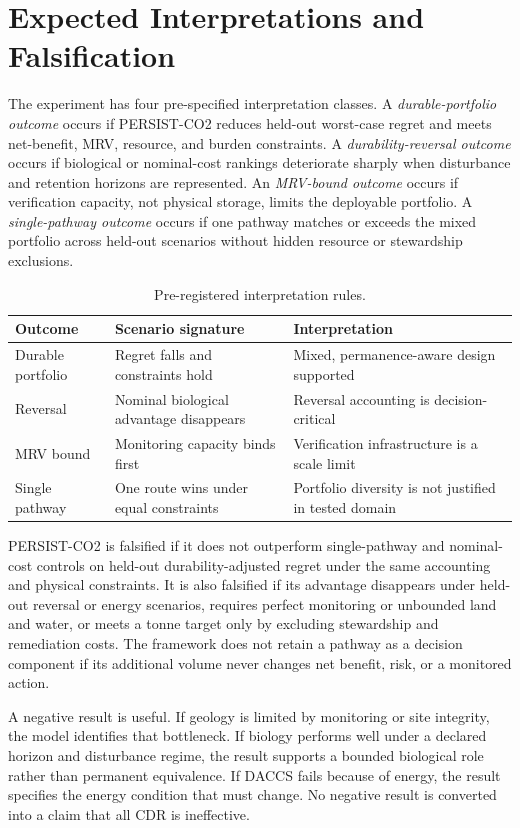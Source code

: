 \documentclass[conference]{IEEEtran}
\begin{document}
\section{Expected Interpretations and Falsification}
The experiment has four pre-specified interpretation classes. A \textit{durable-portfolio outcome} occurs if PERSIST-CO2 reduces held-out worst-case regret and meets net-benefit, MRV, resource, and burden constraints. A \textit{durability-reversal outcome} occurs if biological or nominal-cost rankings deteriorate sharply when disturbance and retention horizons are represented. An \textit{MRV-bound outcome} occurs if verification capacity, not physical storage, limits the deployable portfolio. A \textit{single-pathway outcome} occurs if one pathway matches or exceeds the mixed portfolio across held-out scenarios without hidden resource or stewardship exclusions.

\begin{table}[t]
\centering
\caption{Pre-registered interpretation rules.}
\label{tab:decisions}
\footnotesize
\begin{tabular}{P{1.6cm}P{2.25cm}P{2.25cm}}
\toprule
Outcome & Scenario signature & Interpretation \\
\midrule
Durable portfolio & Regret falls and constraints hold & Mixed, permanence-aware design supported \\
Reversal & Nominal biological advantage disappears & Reversal accounting is decision-critical \\
MRV bound & Monitoring capacity binds first & Verification infrastructure is a scale limit \\
Single pathway & One route wins under equal constraints & Portfolio diversity is not justified in tested domain \\
\bottomrule
\end{tabular}
\end{table}

PERSIST-CO2 is falsified if it does not outperform single-pathway and nominal-cost controls on held-out durability-adjusted regret under the same accounting and physical constraints. It is also falsified if its advantage disappears under held-out reversal or energy scenarios, requires perfect monitoring or unbounded land and water, or meets a tonne target only by excluding stewardship and remediation costs. The framework does not retain a pathway as a decision component if its additional volume never changes net benefit, risk, or a monitored action.

A negative result is useful. If geology is limited by monitoring or site integrity, the model identifies that bottleneck. If biology performs well under a declared horizon and disturbance regime, the result supports a bounded biological role rather than permanent equivalence. If DACCS fails because of energy, the result specifies the energy condition that must change. No negative result is converted into a claim that all CDR is ineffective.
\end{document}
